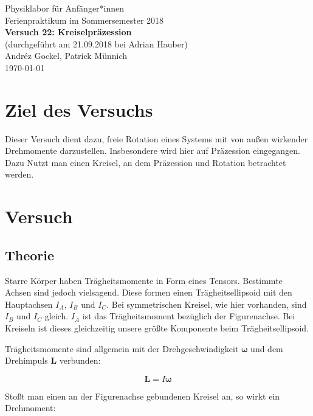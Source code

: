 \documentclass[11pt,a4paper]{article}
\renewcommand{\vec}{\boldsymbol}
\begin{document}
{
\centering 
\large 
Physiklabor für Anf\"anger*innen \\
Ferienpraktikum im Sommersemester 2018 \\[4mm]
\textbf{\LARGE 
Versuch 22: Kreiselpr\"azession
} \\[3mm]
(durchgef\"uhrt am 21.09.2018 bei Adrian Hauber) \\
Andréz Gockel, Patrick M\"unnich\\
\today \\[10mm]
}

\vspace{50pt}
\tableofcontents
\vspace{22pt}
\listoftables
\vspace{22pt}
\listoffigures
\pagebreak

\section{Ziel des Versuchs}

Dieser Versuch dient dazu, freie Rotation eines Systems mit von au\ss en wirkender Drehmomente darzustellen. Insbesondere wird hier auf Pr\"azession eingegangen. Dazu Nutzt man einen Kreisel, an dem Pr\"azession und Rotation betrachtet werden.

\section{Versuch}

\subsection{Theorie}

Starre K\"orper haben Tr\"agheitsmomente in Form eines Tensors. Bestimmte Achsen sind jedoch vielsagend. Diese formen einen Tr\"agheitsellipsoid mit den Hauptachsen $I_A$, $I_B$ und $I_C$. Bei symmetrischen Kreisel, wie hier vorhanden, sind $I_B$ und $I_C$ gleich. $I_A$ ist das Tr\"agheitsmoment bez\"uglich der Figurenachse. Bei Kreiseln ist dieses gleichzeitig unsere gr\"o\ss te Komponente beim Tr\"agheitsellipsoid.

Tr\"agheitsmomente sind allgemein mit der Drehgeschwindigkeit $\vec{\omega}$ und dem Drehimpuls $\vec{L}$ verbunden:

\begin{equation}
\vec{L}=I\vec{\omega}
\end{equation}

Sto\ss t man einen an der Figurenachse gebundenen Kreisel an, so wirkt ein Drehmoment:
\end{document}
